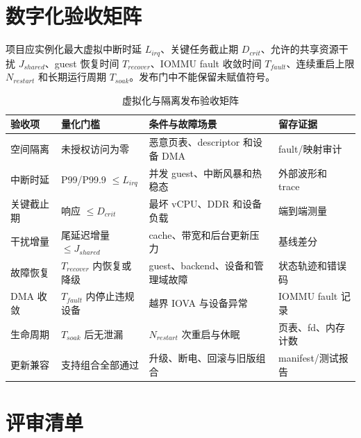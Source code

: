 \section{数字化验收矩阵}

项目应实例化最大虚拟中断时延 $L_{irq}$、关键任务截止期 $D_{crit}$、允许的共享资源干扰 $J_{shared}$、guest 恢复时间 $T_{recover}$、IOMMU fault 收敛时间 $T_{fault}$、连续重启上限 $N_{restart}$ 和长期运行周期 $T_{soak}$。发布门中不能保留未赋值符号。

\begin{table}[H]
  \centering
  \caption{虚拟化与隔离发布验收矩阵}
  \begin{tabular}{p{24mm}p{37mm}p{40mm}p{33mm}}
    \hline
    验收项 & 量化门槛 & 条件与故障场景 & 留存证据 \\
    \hline
    空间隔离 & 未授权访问为零 & 恶意页表、descriptor 和设备 DMA & fault/映射审计 \\
    中断时延 & P99/P99.9 $\leq L_{irq}$ & 并发 guest、中断风暴和热稳态 & 外部波形和 trace \\
    关键截止期 & 响应 $\leq D_{crit}$ & 最坏 vCPU、DDR 和设备负载 & 端到端测量 \\
    干扰增量 & 尾延迟增量 $\leq J_{shared}$ & cache、带宽和后台更新压力 & 基线差分 \\
    故障恢复 & $T_{recover}$ 内恢复或降级 & guest、backend、设备和管理域故障 & 状态轨迹和错误码 \\
    DMA 收敛 & $T_{fault}$ 内停止违规设备 & 越界 IOVA 与设备异常 & IOMMU fault 记录 \\
    生命周期 & $T_{soak}$ 后无泄漏 & $N_{restart}$ 次重启与休眠 & 页表、fd、内存计数 \\
    更新兼容 & 支持组合全部通过 & 升级、断电、回滚与旧版组合 & manifest/测试报告 \\
    \hline
  \end{tabular}
\end{table}

\section{评审清单}

